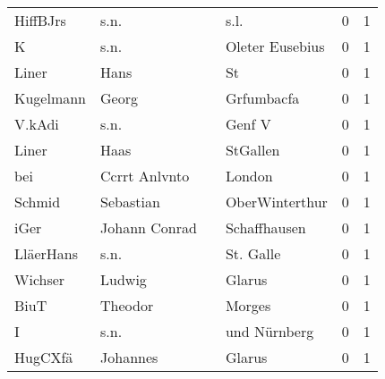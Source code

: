 \begin{center}
\begin{tiny}
\begin{longtabu}{llllrr}
                 HiffBJrs &                               s.n. &             &                                        s.l. &          0 &         1 \\
                        K &                               s.n. &             &                             Oleter Eusebius &          0 &         1 \\
                    Liner &                               Hans &             &                                          St &          0 &         1 \\
                Kugelmann &                              Georg &             &                                  Grfumbacfa &          0 &         1 \\
                   V.kAdi &                               s.n. &             &                                      Genf V &          0 &         1 \\
                    Liner &                               Haas &             &                                    StGallen &          0 &         1 \\
                      bei &                      Ccrrt Anlvnto &             &                                      London &          0 &         1 \\
                   Schmid &                          Sebastian &             &                              OberWinterthur &          0 &         1 \\
                     iGer &                      Johann Conrad &             &                                Schaffhausen &          0 &         1 \\
                LläerHans &                               s.n. &             &                                   St. Galle &          0 &         1 \\
                  Wichser &                             Ludwig &             &                                      Glarus &          0 &         1 \\
                     BiuT &                            Theodor &             &                                      Morges &          0 &         1 \\
                        I &                               s.n. &             &                                und Nürnberg &          0 &         1 \\
                  HugCXfä &                           Johannes &             &                                      Glarus &          0 &         1 \\

\end{longtabu}
\end{tiny}
\end{center}
